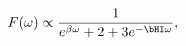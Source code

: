 \begin{equation} \label{analytically-continued-spectrum-rn-4d}
F(\omega) \propto \frac{1}{e^{\beta \omega} + 2 + 3 e^{-\bHI \omega}},
\end{equation}

